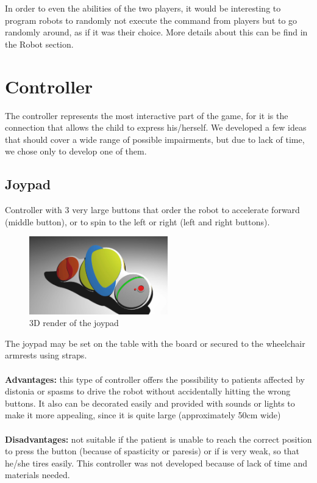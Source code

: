 \documentclass[a4paper,twoside]{book}
\begin{document}
In order to even the abilities of the two players, it would be interesting to program robots to randomly not execute the command from players but to go randomly around, as if it was their choice. More details about this can be find in the Robot section.

\section{Controller}

The controller represents the most interactive part of the game, for it is the connection that allows the child to express his/herself.
We developed a few ideas that should cover a wide range of possible impairments, but due to lack of time, we chose only to develop one of them.

\subsection{Joypad}
Controller with 3 very large buttons that order the robot to accelerate forward (middle button), or to spin to the left or right (left and right buttons).

\begin{figure}
 \includegraphics[width=6cm]{img/controller.eps}
 \caption{3D render of the joypad}
\end{figure}

The joypad may be set on the table with the board or secured to the wheelchair armrests using straps.
\\
\\
\textbf{Advantages:} this type of controller offers the possibility to patients affected by distonia or spasms to drive the robot without accidentally hitting the wrong buttons. It also can be decorated easily and provided with sounds or lights to make it more appealing, since it is quite large (approximately 50cm wide)
\\
\\
\textbf{Disadvantages:} not suitable if the patient is unable to reach the correct position to press the button (because of spasticity or paresis) or if is very weak, so that he/she tires easily.
This controller was not developed because of lack of time and materials needed.
\end{document}
